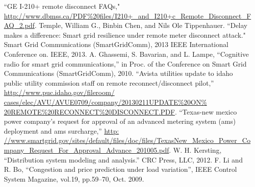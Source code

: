 \documentclass[11pt,oneside]{book}
\begin{document}
\begin{thebibliography}{99}
 ``GE I-210+ remote disconnect FAQs," \url{http://www.dbmss.ca/PDF\%20files/I210+_and_I210+c_Remote_Disconnect_FAQ_2.pdf}.
 Temple, William G., Binbin Chen, and Nils Ole Tippenhauer. ``Delay makes a difference: Smart grid resilience under remote meter disconnect attack." Smart Grid Communications (SmartGridComm), 2013 IEEE International Conference on. IEEE, 2013.
 A. Ghassemi, S. Bavarian, and L. Lampe, ``Cognitive radio for smart grid communications,'' in Proc. of the Conference on Smart Grid Communications (SmartGridComm), 2010.
 ``Avista utilities update to idaho public utility commission staff on remote reconnect/disconnect pilot,'' \url{http://www.puc.idaho.gov/fileroom/ cases/elec/AVU/AVUE0709/company/20130211UPDATE\%20ON\% 20REMOTE\%20RECONNECT\%20DISCONNECT.PDF}.
 ``Texas-new mexico power company’s request for approval of an advanced metering system (ams) deployment and ams surcharge,'' \url{http: //www.smartgrid.gov/sites/default/files/doc/files/TexasNew_Mexico_Power_Company_Request_For_Approval_Advance_201005.pdf}.
 W. H. Kersting, ``Distribution system modeling and analysis.'' CRC Press, LLC, 2012.
 F. Li and R. Bo, ``Congestion and price prediction under load variation'', IEEE Control System Magazine, vol.19, pp.59–70, Oct. 2009.
\end{thebibliography}

\end{document}
